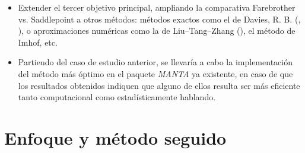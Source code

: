\documentclass[IB,BIB]{TFUOC}%
\begin{document}
{\small
\begin{itemize}
    \item Extender el tercer objetivo principal, ampliando la comparativa Farebrother vs. Saddlepoint a otros métodos: métodos exactos como el de Davies, R. B. (\cite{davies_numerical_1973}, \cite{davies_algorithm_1980}), o aproximaciones numéricas como la de Liu–Tang–Zhang (\cite{qi_genetic_2022}), el método de Imhof, etc.
    \item Partiendo del caso de estudio anterior, se llevaría a cabo la implementación del método más óptimo en el paquete \textit{MANTA} ya existente, en caso de que los resultados obtenidos indiquen que alguno de ellos resulta ser más eficiente tanto computacional como estadísticamente hablando.
\end{itemize}}


% 
% 


\section{Enfoque y método seguido}
\label{sec:Enfoque y método seguido}





%
\end{document}
